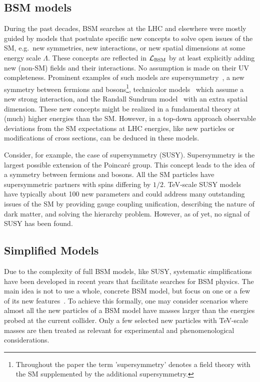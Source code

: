 \subsection{BSM models}

During the past decades, BSM searches at the LHC and elsewhere
were mostly guided by models that postulate specific new concepts to solve open issues of the SM, e.g.\
new symmetries, new interactions, or new spatial dimensions at some energy scale $\Lambda $. 
These concepts are reflected in ${\cal {L}}_{\rm BSM}$ 
by at least explicitly adding new (non-SM) fields
and their interactions.
No assumption is made on their UV completeness.
Prominent examples of such models are supersymmetry~\citep{Wess:1974tw}, a new
symmetry between fermions and bosons\footnote{Throughout the paper the term 'supersymmetry'
denotes a field theory with the SM supplemented by the additional supersymmetry.}, technicolor
models~\citep{Weinberg:1975gm,Susskind:1978ms}  which assume a new strong interaction, and
the Randall Sundrum model~\citep{Randall:1999ee} with an extra spatial dimension.  
These new concepts might be realized in a fundamental theory at (much) higher energies than the SM. However, in a top-down approach
observable deviations from the SM expectations at LHC energies, like new particles or 
modifications of cross sections, can be deduced in these models. 

Consider, for example, the case of supersymmetry (SUSY).
Supersymmetry is the largest possible extension of the Poincar\'{e}
group. This concept
leads to the idea of a symmetry between fermions and
bosons. All the SM particles have supersymmetric partners with spins
differing by $1/2$. 
TeV-scale SUSY models have typically about 100 new parameters and could address many outstanding issues of the SM by providing gauge coupling unification, describing the nature of dark matter, and solving the hierarchy problem.
However, as of yet, no signal of SUSY has been found.  


\subsection{Simplified Models}
\label{sec:SimpMod}

Due to the complexity of full BSM models, like SUSY, systematic simplifications have been developed in recent years that facilitate
searches for BSM physics. 
The main idea is not to use a whole,
concrete BSM model, but focus on one or a few of its new
features~\citep[see, e.g.,][]{alwall2009,alves2011}. To achieve this
formally, one may consider scenarios where almost all the new particles of
a BSM model have masses larger than the energies probed at the current
collider. Only a few selected new particles with TeV-scale masses are
then treated as relevant for experimental and phenomenological considerations.

